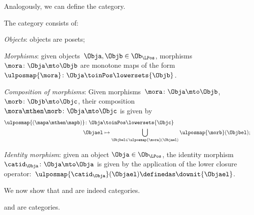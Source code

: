 Analogously, we can define the \LPos category.
\begin{definition}
    \label{def:lpos_cat}
    The category \LPos consists of:
    \begin{compactenum}
        \item \emph{Objects}: objects are posets;
        \item \emph{Morphisms}: given objects~$\Obja,\Objb\in \Ob_{\LPos}$, morphisms~$\mora\colon \Obja\mto \Objb$ are monotone maps of the form~$\ulposmap{\mora} \colon \Obja \toinPos \lowersets{\Objb}$.
        \item \emph{Composition of morphisms}: Given morphisms~$\mora \colon \Obja \mto \Objb$,~$\morb \colon \Objb\mto \Objc$, their composition~$\mora\mthen \morb\colon \Obja\mto \Objc$ is given by
        \begin{equation}
            \begin{aligned}
                \ulposmap{(\mapa \mthen \mapb)} \colon \Obja &\toinPos \lowersets{\Objc}\\
                \Objael&\mapsto \bigcup_{\Objbel\in \ulposmap{\mora} (\Objael)}\ulposmap{\morb}(\Objbel);
            \end{aligned}
        \end{equation}
        \item \emph{Identity morphism}: given an object $\Obja\in \Ob_{\LPos}$, the identity morphism~$\catid_\Obja \colon \Obja \mto \Obja$ is given by the application of the lower closure operator:~$\ulposmap{\catid_\Obja}(\Objael)\definedas \downit\{\Objael\}$.
    \end{compactenum}
\end{definition}

We now show that \UPos and \LPos are indeed categories.

\begin{lemma}
    \label{lem:upos_lpos_cats}
    \UPos and \LPos are categories.
\end{lemma}

